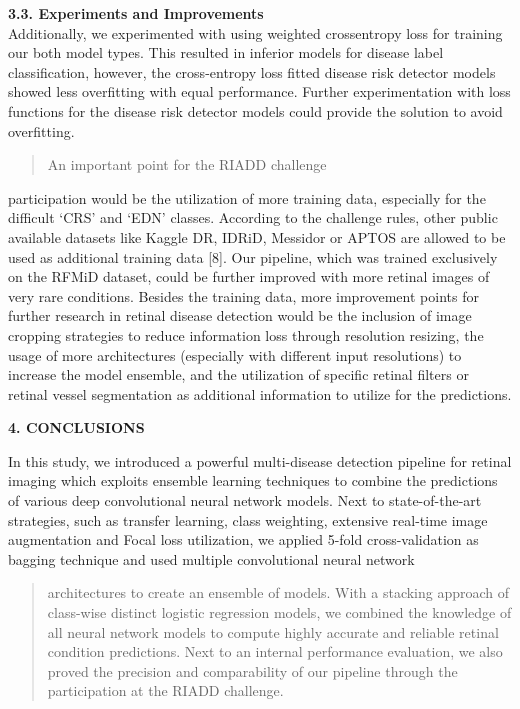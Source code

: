 \documentclass[
]{article}
\begin{document}
\textbf{3.3. Experiments and Improvements}\\
Additionally, we experimented with using weighted crossentropy loss for
training our both model types. This resulted in inferior models for
disease label classification, however, the cross-entropy loss fitted
disease risk detector models showed less overfitting with equal
performance. Further experimentation with loss functions for the disease
risk detector models could provide the solution to avoid overfitting.

\begin{quote}
An important point for the RIADD challenge
\end{quote}

participation would be the utilization of more training data, especially
for the difficult `CRS' and `EDN' classes. According to the challenge
rules, other public available datasets like Kaggle DR, IDRiD, Messidor
or APTOS are allowed to be used as additional training data {[}8{]}. Our
pipeline, which was trained exclusively on the RFMiD dataset, could be
further improved with more retinal images of very rare conditions.
Besides the training data, more improvement points for further research
in retinal disease detection would be the inclusion of image cropping
strategies to reduce information loss through resolution resizing, the
usage of more architectures (especially with different input
resolutions) to increase the model ensemble, and the utilization of
specific retinal filters or retinal vessel segmentation as additional
information to utilize for the predictions.

\textbf{4. CONCLUSIONS}

In this study, we introduced a powerful multi-disease detection pipeline
for retinal imaging which exploits ensemble learning techniques to
combine the predictions of various deep convolutional neural network
models. Next to state-of-the-art strategies, such as transfer learning,
class weighting, extensive real-time image augmentation and Focal loss
utilization, we applied 5-fold cross-validation as bagging technique and
used multiple convolutional neural network

\begin{quote}
architectures to create an ensemble of models. With a stacking approach
of class-wise distinct logistic regression models, we combined the
knowledge of all neural network models to compute highly accurate and
reliable retinal condition predictions. Next to an internal performance
evaluation, we also proved the precision and comparability of our
pipeline through the participation at the RIADD challenge.
\end{quote}
\end{document}
